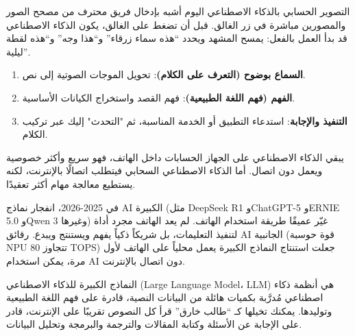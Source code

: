 


التصوير الحسابي بالذكاء الاصطناعي اليوم أشبه بإدخال فريق محترف من مصحح الصور والمصورين مباشرة في زر الغالق. قبل أن تضغط على الغالق، يكون الذكاء الاصطناعي قد بدأ العمل بالفعل: يمسح المشهد ويحدد “هذه سماء زرقاء” و“هذا وجه” و“هذه لقطة ليلية”.


\begin{enumerate}
  \item \textbf{السماع بوضوح (التعرف على الكلام)}: تحويل الموجات الصوتية إلى نص.
  \item \textbf{الفهم (فهم اللغة الطبيعية)}: فهم القصد واستخراج الكيانات الأساسية.
  \item \textbf{التنفيذ والإجابة}: استدعاء التطبيق أو الخدمة المناسبة، ثم "التحدث" إليك عبر تركيب الكلام.
\end{enumerate}


يبقي الذكاء الاصطناعي على الجهاز الحسابات داخل الهاتف، فهو سريع وأكثر خصوصية ويعمل دون اتصال. أما الذكاء الاصطناعي السحابي فيتطلب اتصالًا بالإنترنت، لكنه يستطيع معالجة مهام أكثر تعقيدًا.


في 2025-2026، انفجار نماذج AI الكبيرة (مثل DeepSeek R1 وChatGPT-5 وERNIE 5.0 وQwen 3 وغيرها) غيّر عميقًا طريقة استخدام الهاتف. لم يعد الهاتف مجرد أداة لتنفيذ التعليمات، بل شريكاً ذكياً يفهم ويستنتج ويبدع. رقائق AI الجانبية (قوة حوسبة NPU تتجاوز 80 TOPS) جعلت استنتاج النماذج الكبيرة يعمل محلياً على الهاتف لأول مرة، يمكن استخدام AI دون اتصال بالإنترنت.


النماذج الكبيرة للذكاء الاصطناعي (Large Language Model، LLM) هي أنظمة ذكاء اصطناعي مُدرَّبة بكميات هائلة من البيانات النصية، قادرة على فهم اللغة الطبيعية وتوليدها. يمكنك تخيلها كـ “طالب خارق” قرأ كل النصوص تقريبًا على الإنترنت، قادر على الإجابة عن الأسئلة وكتابة المقالات والترجمة والبرمجة وتحليل البيانات.

